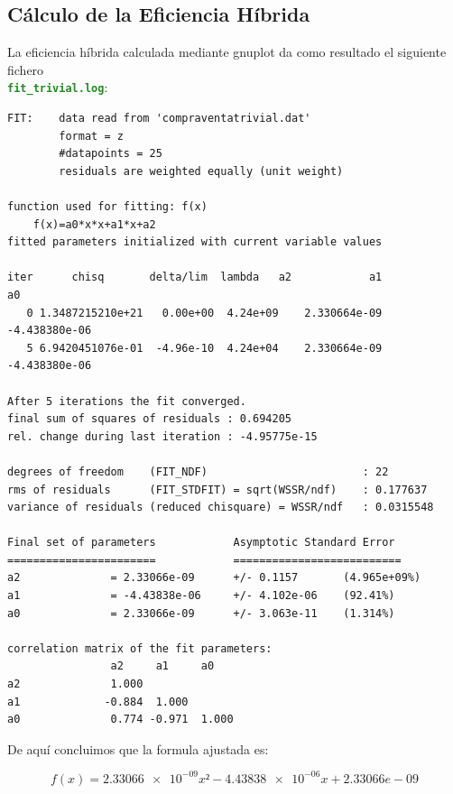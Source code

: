 \documentclass[12pt, spanish]{article}
\def\code#1{\texttt{#1}}
\begin{document}
\subsection {Cálculo de la Eficiencia Híbrida}
La eficiencia híbrida calculada mediante gnuplot da como resultado el siguiente fichero  \\ \textcolor{ForestGreen}{\textbf{\code{fit\_trivial.log}}}:
\begin{verbatim}
FIT:    data read from 'compraventatrivial.dat'
        format = z
        #datapoints = 25
        residuals are weighted equally (unit weight)

function used for fitting: f(x)
	f(x)=a0*x*x+a1*x+a2
fitted parameters initialized with current variable values

iter      chisq       delta/lim  lambda   a2            a1            a0           
   0 1.3487215210e+21   0.00e+00  4.24e+09    2.330664e-09  -4.438380e-06
   5 6.9420451076e-01  -4.96e-10  4.24e+04    2.330664e-09  -4.438380e-06

After 5 iterations the fit converged.
final sum of squares of residuals : 0.694205
rel. change during last iteration : -4.95775e-15

degrees of freedom    (FIT_NDF)                        : 22
rms of residuals      (FIT_STDFIT) = sqrt(WSSR/ndf)    : 0.177637
variance of residuals (reduced chisquare) = WSSR/ndf   : 0.0315548

Final set of parameters            Asymptotic Standard Error
=======================            ==========================
a2              = 2.33066e-09      +/- 0.1157       (4.965e+09%)
a1              = -4.43838e-06     +/- 4.102e-06    (92.41%)
a0              = 2.33066e-09      +/- 3.063e-11    (1.314%)

correlation matrix of the fit parameters:
                a2     a1     a0     
a2              1.000 
a1             -0.884  1.000 
a0              0.774 -0.971  1.000 
\end{verbatim}

De aquí concluimos que la formula ajustada es:

\[f(x)=\num{2.33066e-09}x² - \num{4.43838e-06}x + 2.33066e-09\]
\end{document}

